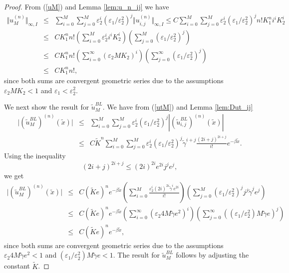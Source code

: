 \documentclass[12pt]{article}
\begin{document}
\begin{proof}
From (\ref{uM}) and Lemma \ref{lem:u_n_ij} we have
%
\begin{eqnarray*}
\Vert u^{(n)}_M \Vert_{\infty, I} &\leq& \sum_{i=0}^M \sum_{j=0}^M \varepsilon_2^i (\varepsilon_1 / \varepsilon_2^2)^j
\Vert u^{(n)}_{i,j} \Vert_{\infty, I} \leq C \sum_{i=0}^M \sum_{j=0}^M \varepsilon_2^i (\varepsilon_1 / \varepsilon_2^2)^j  n ! K_1^n i^i K_2^i \\
&\leq& C K_1^n n! \left( \sum_{i=0}^M \varepsilon_2^i i^i K_2^i\right) \left( \sum_{j=0}^M (\varepsilon_1 / \varepsilon_2^2)^j\right) \\
&\leq& C K_1^n n! \left( \sum_{i=0}^{\infty} (\varepsilon_2 M K_2)^i\right) \left( \sum_{j=0}^{\infty} (\varepsilon_1 / \varepsilon_2^2)^j \right) \\
&\leq& C K_1^n n! ,
\end{eqnarray*}
%
since both sums are convergent geometric series due to the assumptions $\varepsilon_2 M K_2 < 1$ and 
$\varepsilon_1 < \varepsilon_2^2$. 

We next show the result for $\tilde{u}_M^{BL}$. We have from (\ref{utM}) and Lemma \ref{lem:Dut_ij}
%
\begin{eqnarray*}
\vert (\tilde{u}^{BL}_M)^{(n)} (\tilde{x}) \vert  &\leq& \sum_{i=0}^M \sum_{j=0}^M \varepsilon_2^i (\varepsilon_1 / \varepsilon_2^2)^j \left\vert \left(\tilde{u}^{BL}_{i,j}\right)^{(n)}(\tilde{x}) \right\vert \\
&\leq& C \tilde{K}^n  \sum_{i=0}^M \sum_{j=0}^M \varepsilon_2^i (\varepsilon_1 / \varepsilon_2^2)^j   \tilde{\gamma}^{i+j} \frac{(2i+j)^{2i+j}}{i!} e^{-\beta \tilde{x} } .
\end{eqnarray*}
%
Using the inequality
%
\[
(2i+j)^{2i+j} \leq (2i)^{2i} e^{2i} j^j e^j ,
\]
we get 
%
\begin{eqnarray*}
\vert (\tilde{u}^{BL}_M)^{(n)} (\tilde{x}) \vert  &\leq& C (\tilde{K} e)^n e^{-\beta \tilde{x}} \left( \sum_{i=0}^M \frac{\varepsilon_2^i (2i)^{2i} \tilde{\gamma}^i e^{2i}}{i!} \right) \left( \sum_{j=0}^M (\varepsilon_1 / \varepsilon_2^2)^j j^j \tilde{\gamma}^j e^j \right) \\
&\leq& C (\tilde{K} e)^n e^{-\beta \tilde{x}} \left( \sum_{i=0}^{\infty} (\varepsilon_2 4M \tilde{\gamma} e^2)^i \right) \left( \sum_{j=0}^{\infty} ((\varepsilon_1 / \varepsilon_2^2) M \tilde{\gamma} e)^j \right) \\
&\leq& C (\tilde{K} e)^n e^{-\beta \tilde{x}},
\end{eqnarray*}
%
since both sums are convergent geometric series due to the assumptions $\varepsilon_2 4M \tilde{\gamma} e^2 < 1$ and $(\varepsilon_1 / \varepsilon_2^2) M \tilde{\gamma} e < 1$. The result for $\tilde{u}_{M}^{BL}$ follows by adjusting the constant $\tilde{K}$.


\end{proof}
\end{document}
